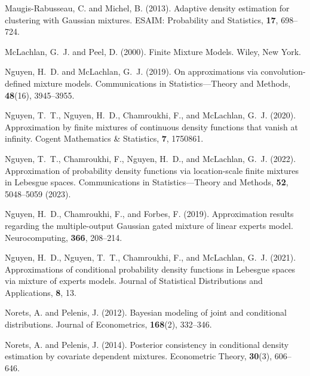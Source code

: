 \documentclass[11pt]{article}
\theoremstyle{definition}
\begin{document}
\begin{thebibliography}{}
Maugis-Rabusseau, C. and Michel, B. (2013).
Adaptive density estimation for clustering with Gaussian mixtures.
ESAIM: Probability and Statistics, \textbf{17}, 698--724.

McLachlan, G.~J. and Peel, D. (2000).
Finite Mixture Models.
Wiley, New York.

Nguyen, H.~D. and McLachlan, G.~J. (2019).
On approximations via convolution-defined mixture models.
Communications in Statistics---Theory and Methods, \textbf{48}(16), 3945--3955.

Nguyen, T.~T., Nguyen, H.~D., Chamroukhi, F., and McLachlan, G.~J. (2020).
Approximation by finite mixtures of continuous density functions that vanish at infinity.
Cogent Mathematics \& Statistics, \textbf{7}, 1750861.

Nguyen, T.~T., Chamroukhi, F., Nguyen, H.~D., and McLachlan, G.~J. (2022).
Approximation of probability density functions via location-scale finite mixtures in Lebesgue spaces.
Communications in Statistics---Theory and Methods, \textbf{52}, 5048--5059 (2023).

Nguyen, H.~D., Chamroukhi, F., and Forbes, F. (2019).
Approximation results regarding the multiple-output Gaussian gated mixture of linear experts model.
Neurocomputing, \textbf{366}, 208--214.

Nguyen, H.~D., Nguyen, T.~T., Chamroukhi, F., and McLachlan, G.~J. (2021).
Approximations of conditional probability density functions in Lebesgue spaces via mixture of experts models.
Journal of Statistical Distributions and Applications, \textbf{8}, 13.

Norets, A. and Pelenis, J. (2012).
Bayesian modeling of joint and conditional distributions.
Journal of Econometrics, \textbf{168}(2), 332--346.

Norets, A. and Pelenis, J. (2014).
Posterior consistency in conditional density estimation by covariate dependent mixtures.
Econometric Theory, \textbf{30}(3), 606--646.


\end{thebibliography}
\end{document}
